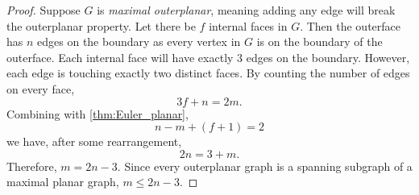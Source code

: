 \begin{proof}
	Suppose \(G\) is \textit{maximal outerplanar}, meaning adding any edge will break the outerplanar property. Let there be \(f\) internal faces in $G$. Then the outerface has \(n\) edges on the boundary as every vertex in $G$ is on the boundary of the outerface. Each internal face will have exactly \(3\) edges on the boundary. However, each edge is touching exactly two distinct faces. By counting the number of edges on every face,
	\begin{equation*}
		3 f + n = 2m.
	\end{equation*}
	Combining with \cref{thm:Euler_planar},
	\begin{equation*}
		n - m + (f + 1) = 2
	\end{equation*}
	we have, after some rearrangement,
	\begin{equation*}
		2n = 3 + m.
	\end{equation*}
	Therefore, \(m = 2n - 3\). Since every outerplanar graph is a spanning subgraph of a maximal planar graph, \(m \leq 2n - 3\).
\end{proof}
